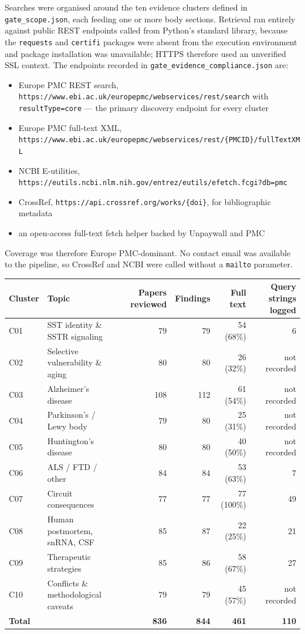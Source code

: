 \documentclass[11pt]{article}
\begin{document}
Searches were organised around the ten evidence clusters defined in \texttt{gate\_scope.json}, each feeding one or more body sections. Retrieval ran entirely against public REST endpoints called from Python's standard library, because the \texttt{requests} and \texttt{certifi} packages were absent from the execution environment and package installation was unavailable; HTTPS therefore used an unverified SSL context. The endpoints recorded in \texttt{gate\_evidence\_compliance.json} are:

\begin{itemize}
\item Europe PMC REST search, \texttt{https://www.ebi.ac.uk/europepmc/webservices/rest/search} with \texttt{resultType=core} --- the primary discovery endpoint for every cluster
\item Europe PMC full-text XML, \texttt{https://www.ebi.ac.uk/europepmc/webservices/rest/\{PMCID\}/fullTextXML}
\item NCBI E-utilities, \texttt{https://eutils.ncbi.nlm.nih.gov/entrez/eutils/efetch.fcgi?db=pmc}
\item CrossRef, \texttt{https://api.crossref.org/works/\{doi\}}, for bibliographic metadata
\item an open-access full-text fetch helper backed by Unpaywall and PMC
\end{itemize}

Coverage was therefore Europe PMC-dominant. No contact email was available to the pipeline, so CrossRef and NCBI were called without a \texttt{mailto} parameter.

\begin{table}[H]
\centering
\small
\begin{tabular}{llrrrr}
\toprule
\textbf{Cluster} & \textbf{Topic} & \textbf{Papers reviewed} & \textbf{Findings} & \textbf{Full text} & \textbf{Query strings logged} \\
\midrule
C01 & SST identity \& SSTR signaling & 79 & 79 & 54 (68\%) & 6 \\
C02 & Selective vulnerability \& aging & 80 & 80 & 26 (32\%) & not recorded \\
C03 & Alzheimer's disease & 108 & 112 & 61 (54\%) & not recorded \\
C04 & Parkinson's / Lewy body & 79 & 80 & 25 (31\%) & not recorded \\
C05 & Huntington's disease & 80 & 80 & 40 (50\%) & not recorded \\
C06 & ALS / FTD / other & 84 & 84 & 53 (63\%) & 7 \\
C07 & Circuit consequences & 77 & 77 & 77 (100\%) & 49 \\
C08 & Human postmortem, snRNA, CSF & 85 & 87 & 22 (25\%) & 21 \\
C09 & Therapeutic strategies & 85 & 86 & 58 (67\%) & 27 \\
C10 & Conflicts \& methodological caveats & 79 & 79 & 45 (57\%) & not recorded \\
\textbf{Total} &  & \textbf{836} & \textbf{844} & \textbf{461} & \textbf{110} \\
\bottomrule
\end{tabular}
\end{table}
\end{document}
